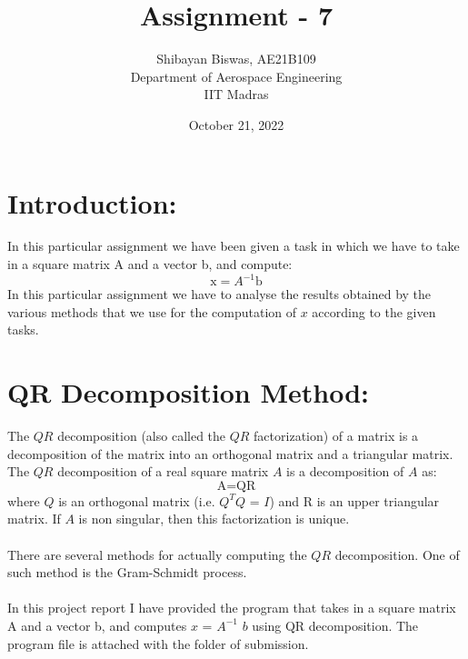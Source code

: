\documentclass[12pt,a4paper]{article}
\author{ Shibayan Biswas, AE21B109\\ Department of Aerospace Engineering\\ IIT Madras}
\title{Assignment - 7}
\date{October 21, 2022}
\begin{document}
\maketitle
\hline
\section{Introduction:}
In this particular assignment we have been given a task in which we have to take in a square matrix A and a vector b, and compute:
\begin{equation}
    \text{x} = \text{$A^{-1}$} \text{b}
\end{equation}
In this particular assignment we have to analyse the results obtained by the various methods that we use for the computation of $x$ according to the given tasks.
\section{QR Decomposition Method:}
The $QR$ decomposition (also called the $QR$ factorization) of a matrix is a decomposition of the matrix into an orthogonal matrix and a triangular matrix. The $QR$ decomposition of a real square matrix $A$ is a decomposition of $A$ as:
\begin{equation}
    \text{A} = \text{Q} \text{R}
\end{equation}
where $Q$ is an orthogonal matrix (i.e. $Q^{T}Q$ = $I$) and R is an upper triangular matrix. If $A$ is non singular, then this factorization is unique.\\
\\There are several methods for actually computing the $QR$ decomposition. One of such method is the Gram-Schmidt process.\\
\\In this project report I have provided the program that takes in a square matrix A and a vector b, and computes $x$ = $A^{-1}$ $b$ using QR decomposition. The program file is attached with the folder of submission.
\clearpage
\end{document}
